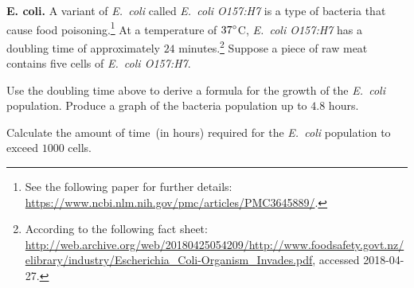\documentclass[a4paper,oneside,12pt]{article}
\begin{document}
\begin{exercise}
\textbf{E. coli.}
A variant of \emph{E.~coli} called \emph{E.~coli O157:H7} is a type of
bacteria that cause food poisoning.\footnote{
  See the following paper for further details:
  \url{https://www.ncbi.nlm.nih.gov/pmc/articles/PMC3645889/}.
}
At a temperature of ${37}^{\circ}$C, \emph{E.~coli O157:H7} has a
doubling time of approximately $24$ minutes.\footnote{
  According to the following fact sheet:
  \url{http://web.archive.org/web/20180425054209/http://www.foodsafety.govt.nz/elibrary/industry/Escherichia_Coli-Organism_Invades.pdf},
  accessed 2018-04-27.
}
Suppose a piece of raw meat contains five cells of
\emph{E.~coli O157:H7}.
\begin{packedenum}
\item\label{subex:E_coli_formula_graph}
  Use the doubling time above to derive a formula for the growth of
  the \emph{E.~coli} population.  Produce a graph of the bacteria
  population up to $4.8$ hours.

\item\label{subex:E_coli_1000_cells}
  Calculate the amount of time~(in hours) required for the
  \emph{E.~coli} population to exceed $1000$ cells.
\end{packedenum}
\end{exercise}
\end{document}
